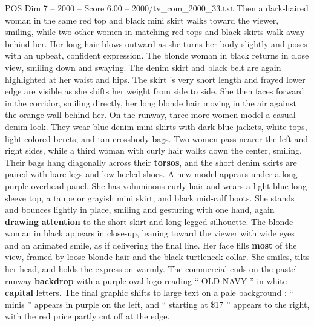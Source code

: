 \begin{textsample}{POS Dim 7 – 2000 – Score 6.00 – 2000/tv\_com\_2000\_33.txt}
Then a dark-haired woman in the same red top and black mini skirt walks toward the viewer, smiling, while two other women in matching red tops and black skirts walk away behind her.
Her long hair blows outward as she turns her body slightly and poses with an upbeat, confident expression.
The blonde woman in black returns in close view, smiling down and swaying.
The denim skirt and black belt are again highlighted at her waist and hips.
The skirt ’s very short length and frayed lower edge are visible as she shifts her weight from side to side.
She then faces forward in the corridor, smiling directly, her long blonde hair moving in the air against the orange wall behind her.
On the runway, three more women model a casual denim look.
They wear blue denim mini skirts with dark blue jackets, white tops, light-colored berets, and tan crossbody bags.
Two women pass nearer the left and right sides, while a third woman with curly hair walks down the center, smiling.
Their bags hang diagonally across their \textbf{torsos}, and the short denim skirts are paired with bare legs and low-heeled shoes.
A new model appears under a long purple overhead panel.
She has voluminous curly hair and wears a light blue long-sleeve top, a taupe or grayish mini skirt, and black mid-calf boots.
She stands and bounces lightly in place, smiling and gesturing with one hand, again \textbf{drawing} \textbf{attention} to the short skirt and long-legged silhouette.
The blonde woman in black appears in close-up, leaning toward the viewer with wide eyes and an animated smile, as if delivering the final line.
Her face fills \textbf{most} of the view, framed by loose blonde hair and the black turtleneck collar.
She smiles, tilts her head, and holds the expression warmly.
The commercial ends on the pastel runway \textbf{backdrop} with a purple oval logo reading “ OLD NAVY ” in white \textbf{capital} letters.
The final graphic shifts to large text on a pale background : “ minis ” appears in purple on the left, and “ starting at \$17 ” appears to the right, with the red price partly cut off at the edge.

\end{textsample}

